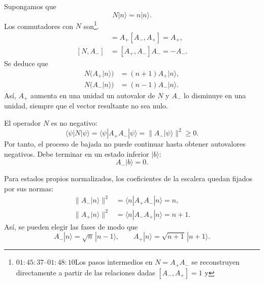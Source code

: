 Supongamos que
\begin{equation}
N|n\rangle=n|n\rangle.
\end{equation}
Los conmutadores con \(N\) son\footnote{\(01{:}45{:}37\)--\(01{:}48{:}10\)Los pasos intermedios en \(N=A_+A_-\) se reconstruyen directamente a partir de las relaciones dadas \([A_-,A_+]=1\) y }.
\begin{align}
[N,A_+]
&=A_+[A_-,A_+]=A_+, \\
[N,A_-]
&=[A_+,A_-]A_-=-A_-.
\end{align}
Se deduce que
\begin{align}
N\bigl(A_+|n\rangle\bigr)
&=(n+1)A_+|n\rangle, \\
N\bigl(A_-|n\rangle\bigr)
&=(n-1)A_-|n\rangle.
\end{align}
Así, \(A_+\) aumenta en una unidad un autovalor de \(N\) y \(A_-\) lo disminuye en una unidad, siempre que el vector resultante no sea nulo.

El operador \(N\) es no negativo:
\begin{equation}
\langle\psi|N|\psi\rangle
=\langle\psi|A_+A_-|\psi\rangle
=\|A_-|\psi\rangle\|^2
\geq0.
\end{equation}
Por tanto, el proceso de bajada no puede continuar hasta obtener autovalores negativos. Debe terminar en un estado inferior \(|b\rangle\):
\begin{equation}
A_-|b\rangle=0.
\end{equation}

Para estados propios normalizados, los coeficientes de la escalera quedan fijados por sus normas:
\begin{align}
\|A_-|n\rangle\|^2
&=\langle n|A_+A_-|n\rangle=n, \\
\|A_+|n\rangle\|^2
&=\langle n|A_-A_+|n\rangle=n+1.
\end{align}
Así, se pueden elegir las fases de modo que
\begin{equation}
A_-|n\rangle=\sqrt{n}\,|n-1\rangle,
\qquad
A_+|n\rangle=\sqrt{n+1}\,|n+1\rangle.
\end{equation}

\begin{classroomqa}
\end{classroomqa}

